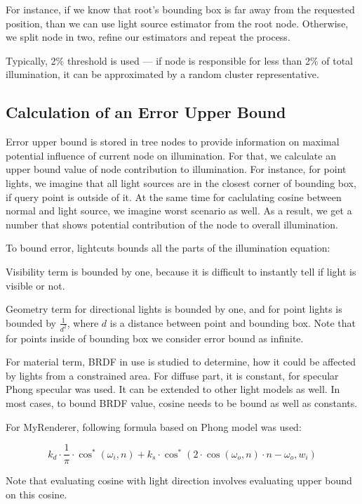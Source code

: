 \documentclass[twocolumn]{article}
\begin{document}
For instance, if we know that root's bounding box is far away from the requested position, than we can use light source estimator from the root node.
Otherwise, we split node in two, refine our estimators and repeat the process.

Typically, 2\% threshold is used --- if node is responsible for less than 2\% of total illumination, it can be approximated by a random cluster representative.

\subsection{Calculation of an Error Upper Bound}

Error upper bound is stored in tree nodes to provide information on maximal potential influence of current node on illumination.
For that, we calculate an upper bound value of node contribution to illumination.
For instance, for point lights, we imagine that all light sources are in the closest corner of bounding box, if query point is outside of it.
At the same time for caclulating cosine between normal and light source, we imagine worst scenario as well. 
As a result, we get a number that shows potential contribution of the node to overall illumination.

To bound error, lightcuts bounds all the parts of the illumination equation:

Visibility term is bounded by one, because it is difficult to instantly tell if light is visible or not.

Geometry term for directional lights is bounded by one, and for point lights is bounded by $\frac{1}{d^2}$, where $d$ is a distance between point and bounding box.
Note that for points inside of bounding box we consider error bound as infinite.

For material term, BRDF in use is studied to determine, how it could be affected by lights from a constrained area.
For diffuse part, it is constant, for specular Phong specular was used. It can be extended to other light models as well.
In most cases, to bound BRDF value, cosine needs to be bound as well as constants.

For MyRenderer, following formula based on Phong model was used:

$$ k_d \cdot \frac{1}{\pi} \cdot \cos^*(\omega_i, n) + k_s \cdot \cos^*(2 \cdot \cos(\omega_o, n) \cdot n - \omega_o, w_i)$$

Note that evaluating cosine with light direction involves evaluating upper bound on this cosine.
\end{document}
